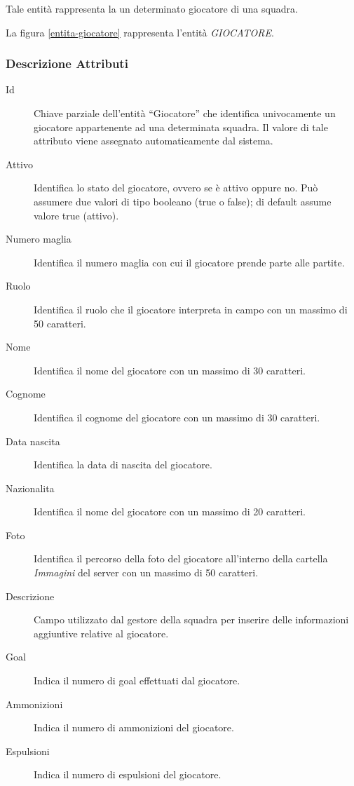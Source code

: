 		Tale entità rappresenta la un determinato giocatore di una squadra.
		
		La figura \ref{entita-giocatore} rappresenta l'entità \emph{GIOCATORE}.
		
		\subsubsection*{Descrizione Attributi}
		
		\begin{description}
			
			\item[Id]
			Chiave parziale dell'entità ``Giocatore'' che identifica univocamente un giocatore appartenente ad una determinata squadra. Il valore di tale attributo viene assegnato automaticamente dal sistema.
			
			\item[Attivo]
			Identifica lo stato del giocatore, ovvero se è attivo oppure no. Può assumere due valori di tipo booleano (true o false); di default assume valore true (attivo).
			
			\item[Numero maglia]
			Identifica il numero maglia con cui il giocatore prende parte alle partite.
			
			\item[Ruolo]
			Identifica il ruolo che il giocatore interpreta in campo con un massimo di 50 caratteri.
			
			\item[Nome]
			Identifica il nome del giocatore con un massimo di 30 caratteri.
			
			\item[Cognome]
			Identifica il cognome del giocatore con un massimo di 30 caratteri.
			
			\item[Data nascita]
			Identifica la data di nascita del giocatore.
			
			\item[Nazionalita]
			Identifica il nome del giocatore con un massimo di 20 caratteri.
			
			\item[Foto]
			Identifica il percorso della foto del giocatore all'interno della cartella \emph{Immagini} del server con un massimo di 50 caratteri.
			
			\item[Descrizione]
			Campo utilizzato dal gestore della squadra per inserire delle informazioni aggiuntive relative al giocatore.
			
			\item[Goal]
			Indica il numero di goal effettuati dal giocatore.
			
			\item[Ammonizioni]
			Indica il numero di ammonizioni del giocatore.
			
			\item[Espulsioni]
			Indica il numero di espulsioni del giocatore.
			
		\end{description}
		
